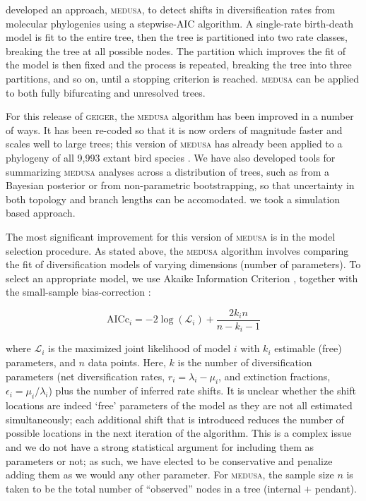 \citet{Alfaro2009} developed an approach, \textsc{medusa}, to detect shifts in diversification rates from molecular phylogenies using a stepwise-AIC algorithm. A single-rate birth-death model is fit to the entire tree, then the tree is partitioned into two rate classes, breaking the tree at all possible nodes. The partition which improves the fit of the model is then fixed and the process is repeated, breaking the tree into three partitions, and so on, until a stopping criterion is reached. \textsc{medusa} can be applied to both fully bifurcating and unresolved trees. 

For this release of \textsc{geiger}, the \textsc{medusa} algorithm has been improved in a number of ways. It has been re-coded so that it is now orders of magnitude faster and scales well to large trees; this version of \textsc{medusa} has already been applied to a phylogeny of all 9,993 extant bird species \citep{Jetz2012}. We have also developed tools for summarizing \textsc{medusa} analyses across a distribution of trees, such as from a Bayesian posterior or from non-parametric bootstrapping, so that uncertainty in both topology and branch lengths can be accomodated. we took a simulation based approach. 

The most significant improvement for this version of \textsc{medusa} is in the model selection procedure. As stated above, the \textsc{medusa} algorithm involves comparing the fit of diversification models of varying dimensions (number of parameters). To select an appropriate model, we use Akaike Information Criterion \citep[AIC;][]{Akaike1974}, together with the small-sample bias-correction \citep[AICc;][]{BA2004}:

\begin{equation}
\mathrm{AICc}_{i} = -2 \log (\mathcal{L}_{i}) +
	\frac{2k_{i}n}{n-k_{i}-1}
\end{equation}

where $\mathcal{L}_{i}$ is the maximized joint likelihood of model $i$ with $k_{i}$ estimable (free) parameters, and $n$ data points. Here, $k$ is the number of diversification parameters (net diversification rates, $r_{i} = \lambda_{i} - \mu_{i}$, and extinction fractions, $\epsilon_{i} = \mu_{i}/\lambda_{i}$) plus the number of inferred rate shifts. It is unclear whether the shift locations are indeed `free' parameters of the model as they are not all estimated simultaneously; each additional shift that is introduced reduces the number of possible locations in the next iteration of the algorithm. This is a complex issue and we do not have a strong statistical argument for including them as parameters or not; as such, we have elected to be conservative and penalize adding them as we would any other parameter. For \textsc{medusa}, the sample size $n$ is taken to be the total number of ``observed'' nodes in a tree (internal $+$ pendant). 

